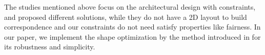 The studies mentioned above focus on the architectural design with constraints, and proposed different solutions, while they do not have a 2D layout to build correspondence and our constraints do not need satisfy properties like fairness. 
In our paper, we implement the shape optimization by the method introduced in \cite{Bouaziz:2012:SSD:2346796.2346802} for its robustness and simplicity.



